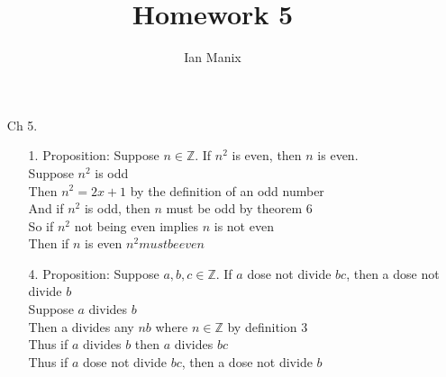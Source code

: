 \documentclass[sigconf]{article}
\title{
  \textbf{Homework 5} \\
  }
\author{ 
  Ian Manix
  }
\begin{document}



\maketitle





\begin{itemize}
  \item[Ch 5.] \begin{itemize} %
      \item[1.] Proposition: Suppose $n\in\mathbb{Z}$. If $n^2$ is even, then $n$ is even.\\
                Suppose $n^2$ is odd\\
                Then $n^2=2x+1$ by the definition of an odd number\\
                And if $n^2$ is odd, then $n$ must be odd by theorem 6\\
                So if $n^2$ not being even implies $n$ is not even\\
                Then if $n$ is even $n^2 must be even$

      \item[4.] Proposition: Suppose $a,b,c\in\mathbb{Z}$. If $a$ dose not divide $bc$, then a dose not divide $b$\\
                Suppose $a$ divides $b$\\
                Then a divides any $nb$ where $n\in\mathbb{Z}$ by definition 3\\
                Thus if $a$ divides $b$ then $a$ divides $bc$\\
                Thus if $a$ dose not divide $bc$, then a dose not divide $b$


\end{itemize}
\end{itemize}
\end{document}
